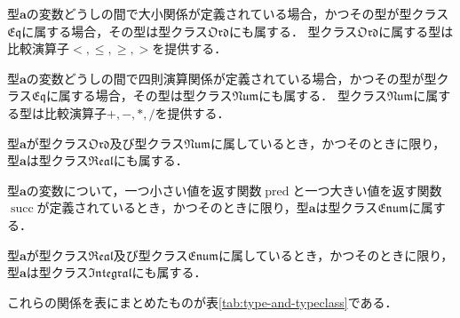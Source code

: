 \documentclass[twocolumn]{jsbook}
\newcommand{\typeclassname}[1]{\mathfrak{#1}}
\newcommand{\typeclassenum}{\typeclassname{Enum}}
\newcommand{\typeclasseq}{\typeclassname{Eq}}
\newcommand{\typeclassintegral}{\typeclassname{Integral}}
\newcommand{\typeclassnum}{\typeclassname{Num}}
\newcommand{\typeclassord}{\typeclassname{Ord}}
\newcommand{\typeclassreal}{\typeclassname{Real}}
\newcommand{\typename}[1]{\mathbf{#1}}
\newcommand{\binaryl}{<}
\newcommand{\binaryle}{\le}
\newcommand{\binaryge}{\ge}
\newcommand{\binaryg}{>}
\newcommand{\binaryadd}{+}
\newcommand{\binarysub}{-}
\newcommand{\binarymultiply}{*}
\newcommand{\binarydivide}{/}
\newcommand{\functionpred}{\mathop{\text{pred}}}
\newcommand{\functionsucc}{\mathop{\text{succ}}}
\begin{document}
型$\typename{a}$の変数どうしの間で大小関係が定義されている場合，かつその型が型クラス$\typeclasseq$に属する場合，その型は型クラス$\typeclassord$にも属する．
型クラス$\typeclassord$に属する型は比較演算子$\binaryl,\binaryle,\binaryge,\binaryg$を提供する．

型$\typename{a}$の変数どうしの間で四則演算関係が定義されている場合，かつその型が型クラス$\typeclasseq$に属する場合，その型は型クラス$\typeclassnum$にも属する．
型クラス$\typeclassnum$に属する型は比較演算子$\binaryadd,\binarysub,\binarymultiply,\binarydivide$を提供する．

型$\typename{a}$が型クラス$\typeclassord$及び型クラス$\typeclassnum$に属しているとき，かつそのときに限り，型$\typename{a}$は型クラス$\typeclassreal$にも属する．

型$\typename{a}$の変数について，一つ小さい値を返す関数$\functionpred$と一つ大きい値を返す関数$\functionsucc$が定義されているとき，かつそのときに限り，型$\typename{a}$は型クラス$\typeclassenum$に属する．

型$\typename{a}$が型クラス$\typeclassreal$及び型クラス$\typeclassenum$に属しているとき，かつそのときに限り，型$\typename{a}$は型クラス$\typeclassintegral$にも属する．

これらの関係を表にまとめたものが表\ref{tab:type-and-typeclass}である．
\end{document}
